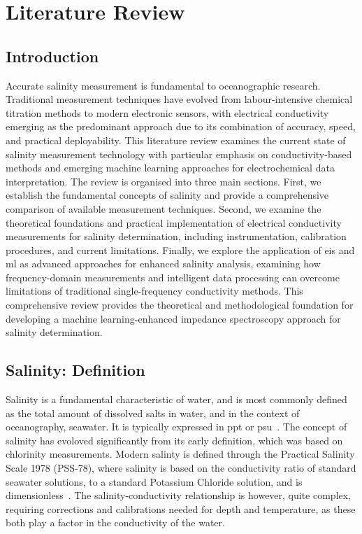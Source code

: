 \chapter{Literature Review}
\section{Introduction}
Accurate salinity measurement is fundamental to oceanographic research.
Traditional measurement techniques have evolved from labour-intensive chemical titration methods to modern electronic sensors, with electrical conductivity emerging as the predominant approach due to its combination of accuracy, speed, and practical deployability.
This literature review examines the current state of salinity measurement technology with particular emphasis on conductivity-based methods and emerging machine learning approaches for electrochemical data interpretation. The review is organised into three main sections.
First, we establish the fundamental concepts of salinity and provide a comprehensive comparison of available measurement techniques.
Second, we examine the theoretical foundations and practical implementation of electrical conductivity measurements for salinity determination, including instrumentation, calibration procedures, and current limitations.
Finally, we explore the application of \gls{eis} and \gls{ml} as advanced approaches for enhanced salinity analysis, examining how frequency-domain measurements and intelligent data processing can overcome limitations of traditional single-frequency conductivity methods.
This comprehensive review provides the theoretical and methodological foundation for developing a machine learning-enhanced impedance spectroscopy approach for salinity determination.

\section{Salinity: Definition}
Salinity is a fundamental characteristic of water, and is most commonly defined as the total amount of dissolved salts in water, and in the context of oceanography, seawater.
It is typically expressed in \gls{ppt} or \gls{psu}~\cite{salinity_def}. 
The concept of salinity has evoloved significantly from its early definition, which was based on chlorinity measurements.
Modern salinty is defined through the Practical Salinity Scale 1978 (PSS-78), where salinity is based on the conductivity ratio of standard seawater solutions, to a standard Potassium Chloride solution, and is dimensionless~\cite{unesco_salinity}.
The salinity-conductivity relationship is however, quite complex, requiring corrections and calibrations needed for depth and temperature, as these both play a factor in the conductivity of the water. 

